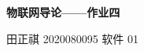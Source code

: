 \begin{center}
    \Large\textbf{物联网导论——作业四}
    \vspace{1em}

    \normalsize 田正祺 \hspace{1em} 2020080095 \hspace{1em} 软件 01
\end{center}